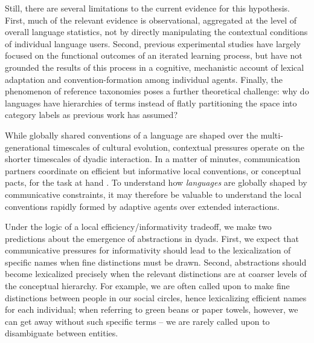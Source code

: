 Still, there are several limitations to the current evidence for this hypothesis. 
First, much of the relevant evidence is observational, aggregated at the level of overall language statistics, not by directly manipulating the contextual conditions of individual language users. 
Second, previous experimental studies have largely focused on the functional outcomes of an iterated learning process, %
but have not grounded the results of this process in a cognitive, mechanistic account of lexical adaptation and convention-formation among individual agents. 
Finally, the phenomenon of reference taxonomies poses a further theoretical challenge: why do languages have hierarchies of terms instead of flatly partitioning the space into category labels as previous work has assumed?

While globally shared conventions of a language are shaped over the multi-generational timescales of cultural evolution, contextual pressures operate on the shorter timescales of dyadic interaction. 
In a matter of minutes, communication partners coordinate on efficient but informative local conventions, or conceptual pacts, for the task at hand \cite{ClarkWilkesGibbs86_ReferringCollaborative,HawkinsFrankGoodman17_ConventionFormation}. %
To understand how \emph{languages} are globally shaped by communicative constraints, it may therefore be valuable to understand the local conventions rapidly formed by adaptive agents over extended interactions.

Under the logic of a local efficiency/informativity tradeoff, we make two predictions about the emergence of abstractions in dyads. First, we expect that communicative pressures for informativity should lead to the lexicalization of specific names when fine distinctions must be drawn. Second, abstractions should become lexicalized precisely when the relevant distinctions are at coarser levels of the conceptual hierarchy. 
For example, we are often called upon to make fine distinctions between people in our social circles, hence lexicalizing efficient names for each individual; when referring to green beans or paper towels, however, we can get away without such specific terms -- we are rarely called upon to disambiguate between entities. %

